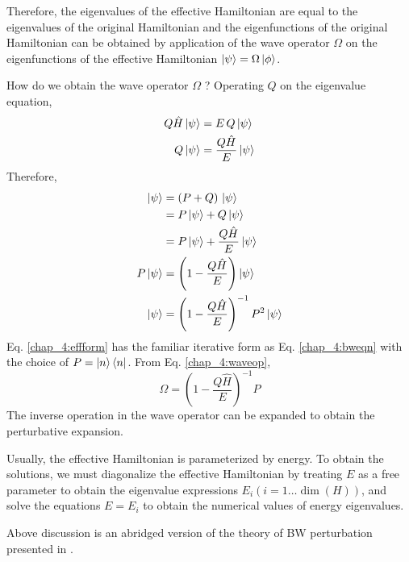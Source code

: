 Therefore, the eigenvalues of the effective Hamiltonian are equal to the eigenvalues of the original Hamiltonian and the 
eigenfunctions of the original Hamiltonian can be obtained by application of the wave operator $\Omega$ on the eigenfunctions of
the effective Hamiltonian $\ket{\psi} = \Omega\ket{\phi}$.

How do we obtain the wave operator $\Omega$ ? Operating $Q$ on the eigenvalue equation,
\begin{align*}
 Q\hat{H}\ket{\psi} &= E\,Q\ket{\psi} \\
 Q\ket{\psi} &= \frac{Q\hat{H}}{E}\ket{\psi}
\end{align*}
Therefore,
\begin{align}
  \ket{\psi} &= (P + Q)\,\ket{\psi} \nonumber \\
  &= P\ket{\psi} + Q\ket{\psi} \nonumber \\
  \label{chap_4:effform} &= P\ket{\psi} + \frac{Q\hat{H}}{E}\ket{\psi} \\
  P\ket{\psi} &= \left(1-\frac{Q\hat{H}}{E}\right)\ket{\psi} \nonumber \\
  \label{chap_4:waveop} \ket{\psi} &= \left(1-\frac{Q\hat{H}}{E}\right)^{-1} P^2 \ket{\psi}  
\end{align} Eq. \eqref{chap_4:effform} has the familiar iterative form as Eq. \eqref{chap_4:bweqn} with the choice of 
$P = \ket{n}\bra{n}$. From Eq. \eqref{chap_4:waveop}, 
\begin{equation}
 \Omega = \left(1-\frac{Q\hat{H}}{E}\right)^{-1}P
\end{equation}
The inverse operation in the wave operator can be expanded to obtain the perturbative expansion.

Usually, the effective Hamiltonian is parameterized by energy. To obtain the solutions, we must diagonalize the effective Hamiltonian by treating $E$ as a free parameter to
obtain the eigenvalue expressions $E_{i} (i=1\dots \dim(H))$, and solve the equations $E = E_{i}$ to obtain the numerical values of energy eigenvalues.

Above discussion is an abridged version of the theory of BW perturbation presented in \parencite{wilson2009brillouin}.